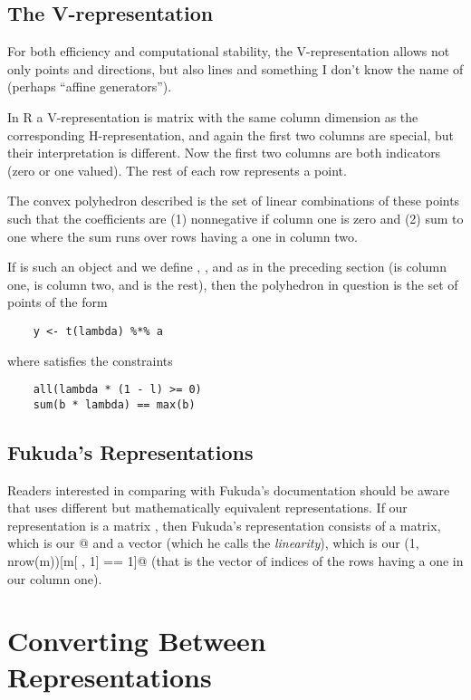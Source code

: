\documentclass{article}
\begin{document}
\subsection{The V-representation}

For both efficiency and computational stability, the V-representation
allows not only points and directions, but also lines and something I
don't know the name of (perhaps ``affine generators'').

In R a V-representation is matrix with the same column dimension as
the corresponding H-representation, and again the first two columns
are special,
but their interpretation is different.  Now the first two columns
are both indicators (zero or one valued).  The rest of each row
represents a point.

The convex polyhedron described is the set of linear combinations of
these points such that the coefficients are (1) nonnegative if
column one is zero and (2) sum to one where the sum runs over
rows having a one in column two.

If \verb@m@ is such an object and we define \verb@a@, \verb@b@, and
\verb@l@ as in the preceding section (\verb@l@ is column one, \verb@b@ is
column two, and \verb@a@ is the rest), then the polyhedron in question
is the set of points of the form
\begin{verbatim}
    y <- t(lambda) %*% a
\end{verbatim}
where \verb@lambda@ satisfies the constraints
\begin{verbatim}
    all(lambda * (1 - l) >= 0)
    sum(b * lambda) == max(b)
\end{verbatim}

\subsection{Fukuda's Representations}

Readers interested in comparing with Fukuda's documentation should be
aware that \verb@cddlib@ uses different but mathematically equivalent
representations.
If our representation is a matrix \verb@m@, then Fukuda's representation
consists of a matrix, which is our \verb@m[ , -1]@ and a vector
(which he calls the \emph{linearity}), which is our
\verb@seq(1, nrow(m))[m[ , 1] == 1]@
(that is the vector of indices of the rows having a one in our column one).

\section{Converting Between Representations}
\end{document}
